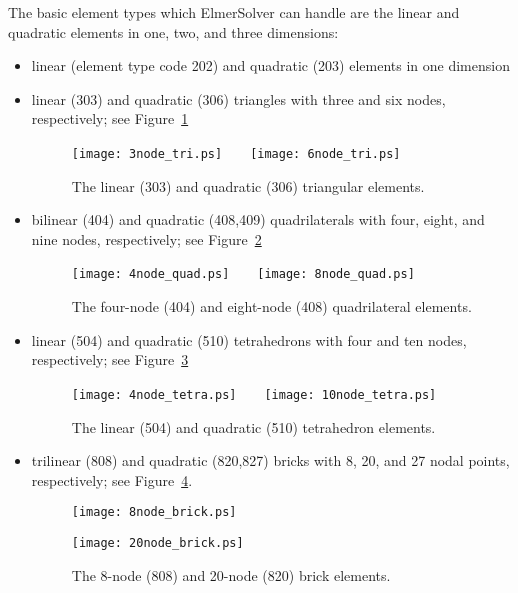 
\label{elements}

The basic element types which ElmerSolver can handle are
the linear and quadratic elements in one, two, and three dimensions:
\begin{itemize}
\item linear (element type code 202) and quadratic (203) elements in one dimension
\item linear (303) and quadratic (306) triangles with three and six nodes, respectively; 
see Figure~\ref{triangles}
\begin{figure}[h]
\centerline{ \texttt{[image: 3node\_tri.ps]}\ \ \ \ \texttt{[image: 6node\_tri.ps]} }
\caption{The linear (303) and quadratic (306) triangular elements.}
\label{triangles}
\end{figure}
\item bilinear (404) and quadratic (408,409) quadrilaterals with four, eight, and nine nodes, respectively;  
see Figure~\ref{quads}
\begin{figure}[h]
\centerline{ \texttt{[image: 4node\_quad.ps]}\ \ \ \ \texttt{[image: 8node\_quad.ps]} }
\caption{The four-node (404) and  eight-node (408) quadrilateral elements.}
\label{quads}
\end{figure}
\item linear (504) and quadratic (510) tetrahedrons with four and ten nodes, respectively; 
see Figure~\ref{tetras}
\begin{figure}[h]
\centerline{ \texttt{[image: 4node\_tetra.ps]}\ \ \ \ \texttt{[image: 10node\_tetra.ps]} }
\caption{The linear (504) and quadratic (510) tetrahedron elements.}
\label{tetras}
\end{figure}
\item  trilinear (808) and
quadratic (820,827) bricks  with 8, 20, and 27 nodal points, respectively; see Figure~\ref{hexas}.
\begin{figure}[h]
\centerline{ \texttt{[image: 8node\_brick.ps]}}
\centerline{ \texttt{[image: 20node\_brick.ps]}}
 \caption{The 8-node (808) and 20-node (820) brick elements.}
\label{hexas}
\end{figure}
\end{itemize}


